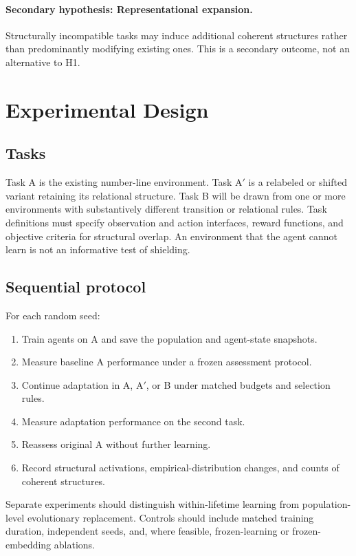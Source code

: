 \documentclass[11pt]{article}
\begin{document}
\paragraph{Secondary hypothesis: Representational expansion.}
Structurally incompatible tasks may induce additional coherent structures rather than predominantly modifying existing ones. This is a secondary outcome, not an alternative to H1.

\section{Experimental Design}
\subsection{Tasks}
Task A is the existing number-line environment. Task A$'$ is a relabeled or shifted variant retaining its relational structure. Task B will be drawn from one or more environments with substantively different transition or relational rules. Task definitions must specify observation and action interfaces, reward functions, and objective criteria for structural overlap. An environment that the agent cannot learn is not an informative test of shielding.

\subsection{Sequential protocol}
For each random seed:
\begin{enumerate}[label=\arabic*.]
\item Train agents on A and save the population and agent-state snapshots.
\item Measure baseline A performance under a frozen assessment protocol.
\item Continue adaptation in A, A$'$, or B under matched budgets and selection rules.
\item Measure adaptation performance on the second task.
\item Reassess original A without further learning.
\item Record structural activations, empirical-distribution changes, and counts of coherent structures.
\end{enumerate}
Separate experiments should distinguish within-lifetime learning from population-level evolutionary replacement. Controls should include matched training duration, independent seeds, and, where feasible, frozen-learning or frozen-embedding ablations.
\end{document}

